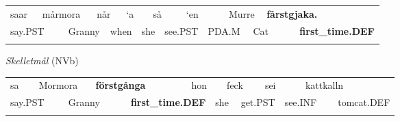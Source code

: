 \begin{tabular}{llllllllllllllll}
\lsptoprule
saar & \multicolumn{2}{l}{mårmora

} & \multicolumn{2}{l}{når

} & \multicolumn{2}{l}{‘a

} & \multicolumn{2}{l}{så

} & \multicolumn{2}{l}{‘en

} & \multicolumn{2}{l}{Murre

} & \multicolumn{2}{l}{{\bfseries fårstgjaka.}

} & \\
\multicolumn{2}{l}{say.PST

} & \multicolumn{2}{l}{Granny

} & \multicolumn{2}{l}{when

} & \multicolumn{2}{l}{she

} & \multicolumn{2}{l}{see.PST

} & \multicolumn{2}{l}{PDA.M

} & \multicolumn{2}{l}{Cat

} & \multicolumn{2}{l}{{\bfseries first\_time.DEF}

}\\
\lspbottomrule
\end{tabular}

\begin{styleExLtrTblii}
\textit{Skelletmål} (NVb)

\end{styleExLtrTblii}

\begin{tabular}{llllllllllllll}
\lsptoprule
sa & \multicolumn{2}{l}{Mormora

} & \multicolumn{2}{l}{{\bfseries förstgånga}

} & \multicolumn{2}{l}{hon

} & \multicolumn{2}{l}{feck

} & \multicolumn{2}{l}{sei

} & \multicolumn{2}{l}{kattkalln

} & \\
\multicolumn{2}{l}{say.PST

} & \multicolumn{2}{l}{Granny

} & \multicolumn{2}{l}{{\bfseries first\_time.DEF}

} & \multicolumn{2}{l}{she

} & \multicolumn{2}{l}{get.PST

} & \multicolumn{2}{l}{see.INF

} & \multicolumn{2}{l}{tomcat.DEF

}\\
\lspbottomrule
\end{tabular}

